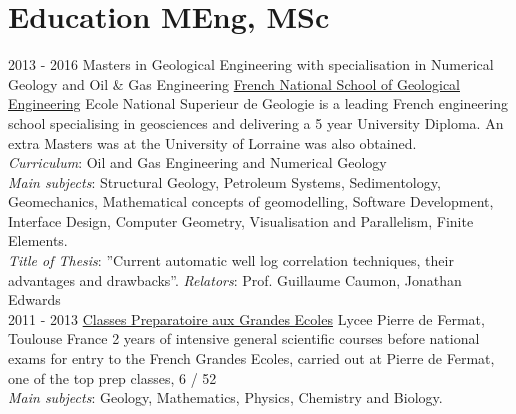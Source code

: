 \documentclass[]{friggeri-cv}
\begin{document}
\section{Education MEng, MSc}
\begin{entrylist}
  \entry
    {2013 - 2016}
    {Masters in Geological Engineering with specialisation in Numerical Geology and Oil \& Gas Engineering}
    {\href{http://ensg.univ-lorraine.fr/english/}{French National School of Geological Engineering}}
    {Ecole National Superieur de Geologie is a leading French engineering school specialising in geosciences and delivering a 5 year University Diploma. An extra Masters was at the University of Lorraine was also obtained.\\ \emph{Curriculum}: Oil and Gas Engineering and Numerical Geology\\ 
    \emph{Main subjects}: Structural Geology, Petroleum Systems, Sedimentology, Geomechanics, Mathematical concepts of geomodelling, Software Development, Interface Design, Computer Geometry, Visualisation and Parallelism, Finite Elements.\\
    \emph{Title of Thesis}: ”Current automatic well log correlation techniques, their advantages and drawbacks”.
    \emph{Relators}: Prof. Guillaume Caumon, Jonathan Edwards\\}
  \entry
    {2011 - 2013}
    {\href{https://en.wikipedia.org/wiki/Classe_preparatoire_aux_grandes_ecoles}{Classes Preparatoire aux Grandes Ecoles}}
    {Lycee Pierre de Fermat, Toulouse France}
    {2 years of intensive general scientific courses before national exams for entry to the French Grandes Ecoles, carried out at Pierre de Fermat, one of the top prep classes, 6 / 52\\ 
    \emph{Main subjects}: Geology, Mathematics, Physics, Chemistry and Biology.\\}
\end{entrylist}
\vspace*{\fill}
\end{document}
